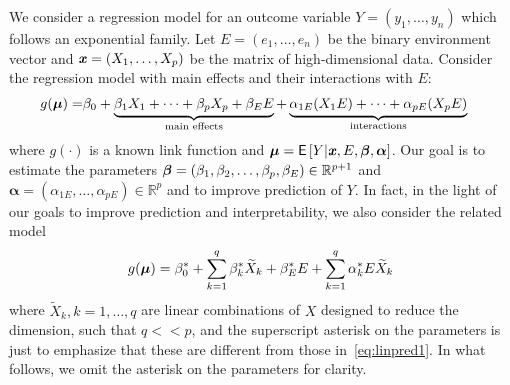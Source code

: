 We consider a regression model for an outcome variable $Y=(y_1, \ldots, y_n)$ which follows an exponential family. Let $E=(e_1, \ldots, e_n)$ be the binary environment vector and $\textbf{\emph{x}} = (X_{1}, \ldots, X_{p})$ be the matrix of high-dimensional data. Consider the regression model with main effects and their interactions with $E$:
\begin{align}
g(\boldsymbol{\mu})  = & \beta_0  + \underbrace{\beta_1 X_{1} + \cdots + \beta_p X_p + \beta_{E} E}_{\textrm{{main effects}}} + \underbrace{\alpha_{1E} (X_1 E) + \cdots + \alpha_{pE} (X_p E)}_{\textrm{{interactions}}} \label{eq:linpred1}
\end{align}
where $g(\cdot)$ is a known link function and $\boldsymbol{\mu} = {\mathsf E}\left[Y|\textbf{\emph{x}}, E, \boldsymbol{\beta},\boldsymbol{\alpha}\right]$. Our goal is to estimate the parameters \mbox{$\boldsymbol{\beta} = \left(\beta_1, \beta_2, \ldots, \beta_p, \beta_E\right) \in \mathbb{R}^{p+1}$} and $\boldsymbol{\alpha} = \left(\alpha_{1E}, \ldots, \alpha_{pE}\right) \in \mathbb{R}^p$ and to improve prediction of $Y$. In fact, in the light of our goals to improve prediction and interpretability, we also consider the related model
\begin{equation}  g(\boldsymbol{\mu}) = \beta^*_0 + \sum_{k=1}^q \beta^*_k \widetilde{X}_k + \beta^*_E E + 
\sum_{k=1}^q \alpha^*_k E \widetilde{X}_k 
\label{eq:linpred1.1}
\end{equation}
where $\widetilde{X}_k, k=1, \ldots, q$ are linear combinations of $X$ designed to reduce the dimension, such that $q<<p$, and the superscript asterisk on the parameters is just to emphasize that these are different from those in~\eqref{eq:linpred1}. In what follows, we omit the asterisk on the parameters for clarity.


